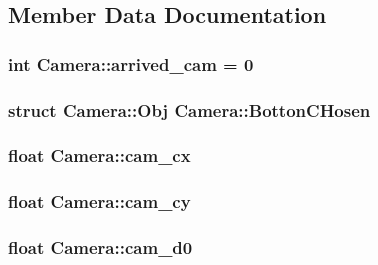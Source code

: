 \subsection{Member Data Documentation}
\hypertarget{classCamera_adab75acb909d6bfb2caebccb8b79e6e5}{
\subsubsection[{arrived\-\_\-cam}]{\setlength{\rightskip}{0pt plus 5cm}int Camera\-::arrived\-\_\-cam = 0}}\label{classCamera_adab75acb909d6bfb2caebccb8b79e6e5}
\hypertarget{classCamera_a55fdd9bd264fca1c865c497fcdb4e74f}{
\subsubsection[{Botton\-C\-Hosen}]{\setlength{\rightskip}{0pt plus 5cm}struct {\bf Camera\-::\-Obj}  Camera\-::\-Botton\-C\-Hosen}}\label{classCamera_a55fdd9bd264fca1c865c497fcdb4e74f}
\hypertarget{classCamera_a11d3e628c9fdc64a5c20661296976177}{
\subsubsection[{cam\-\_\-cx}]{\setlength{\rightskip}{0pt plus 5cm}float Camera\-::cam\-\_\-cx}}\label{classCamera_a11d3e628c9fdc64a5c20661296976177}
\hypertarget{classCamera_aa90c06105f326518304bb8b3f4790339}{
\subsubsection[{cam\-\_\-cy}]{\setlength{\rightskip}{0pt plus 5cm}float Camera\-::cam\-\_\-cy}}\label{classCamera_aa90c06105f326518304bb8b3f4790339}
\hypertarget{classCamera_a083cada78af8082bbbc6007771cd50b3}{
\subsubsection[{cam\-\_\-d0}]{\setlength{\rightskip}{0pt plus 5cm}float Camera\-::cam\-\_\-d0}}\label{classCamera_a083cada78af8082bbbc6007771cd50b3}
